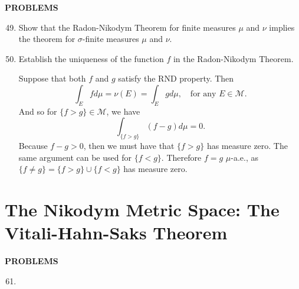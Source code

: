 \begin{center}
	\textbf{PROBLEMS}
\end{center}
\begin{enumerate}
	\setcounter{enumi}{48}
    \item Show that the Radon-Nikodym Theorem for finite measures $\mu$ and $\nu$ implies the theorem for $\sigma$-finite measures $\mu$ and $\nu$.
    \item Establish the uniqueness of the function $f$ in the Radon-Nikodym Theorem.
    
    Suppose that both $f$ and $g$ satisfy the RND property.
    Then 
    \[
        \int_Efd\mu=\nu(E)=\int_Egd\mu,\quad\text{for any }E\in\mathcal{M}.
    \]
    And so for $\{f>g\}\in\mathcal{M}$, we have
    \[
        \int_{\{f>g\}}(f-g)d\mu=0.
    \]
    Because $f-g>0$, then we must have that $\{f>g\}$ has measure zero.
    The same argument can be used for $\{f<g\}$.
    Therefore $f=g$ $\mu$-a.e., as $\{f\neq g\}=\{f>g\}\cup\{f<g\}$ has measure zero.
\end{enumerate}

\section{The Nikodym Metric Space: The Vitali-Hahn-Saks Theorem}
\begin{center}
	\textbf{PROBLEMS}
\end{center}
\begin{enumerate}
	\setcounter{enumi}{60}
    \item 
\end{enumerate}
